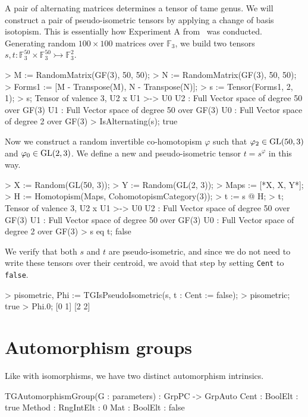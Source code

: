 \documentclass{documentation}
\DeclareMathOperator{\GL}{{\rm GL}}
\begin{document}
\begin{example}[PseudoIsometries]
    A pair of alternating matrices determines a tensor of tame genus. We will construct a pair of pseudo-isometric tensors by applying a change of basis isotopism. This is essentially how Experiment A from~\cite{BMW} was conducted. Generating random $100\times 100$ matrices over $\mathbb{F}_3$, we build two tensors $s,t : \mathbb{F}_3^{50} \times \mathbb{F}_3^{50}\rightarrowtail\mathbb{F}_3^2$. 
\begin{code}
> M := RandomMatrix(GF(3), 50, 50);
> N := RandomMatrix(GF(3), 50, 50);
> Forms1 := [M - Transpose(M), N - Transpose(N)];
> s := Tensor(Forms1, 2, 1);
> s;
Tensor of valence 3, U2 x U1 >-> U0
U2 : Full Vector space of degree 50 over GF(3)
U1 : Full Vector space of degree 50 over GF(3)
U0 : Full Vector space of degree 2 over GF(3)
> IsAlternating(s);
true       
\end{code}

    Now we construct a random invertible co-homotopism $\varphi$ such that $\varphi_2\in \GL(50, 3)$ and $\varphi_0\in\GL(2, 3)$. We define a new and pseudo-isometric tensor $t=s^{\varphi}$ in this way.
\begin{code}
> X := Random(GL(50, 3));
> Y := Random(GL(2, 3));
> Maps := [*X, X, Y*];
> H := Homotopism(Maps, CohomotopismCategory(3));
> t := s @ H;
> t;
Tensor of valence 3, U2 x U1 >-> U0
U2 : Full Vector space of degree 50 over GF(3)
U1 : Full Vector space of degree 50 over GF(3)
U0 : Full Vector space of degree 2 over GF(3)
> s eq t;
false     
\end{code}

    We verify that both $s$ and $t$ are pseudo-isometric, and since we do not need to write these tensors over their centroid, we avoid that step by setting \texttt{Cent} to \texttt{false}.
\begin{code}
> pisometric, Phi := TGIsPseudoIsometric(s, t : Cent := false);
> pisometric;
true
> Phi.0;
[0 1]
[2 2]
\end{code}
\end{example}



\chapter{Automorphism groups}

Like with isomorphisms, we have two distinct automorphism intrinsics. 

\begin{intrinsics}
TGAutomorphismGroup(G : parameters) : GrpPC -> GrpAuto
    Cent : BoolElt : true
    Method : RngIntElt : 0 
    Mat : BoolElt : false
\end{intrinsics}
\end{document}

